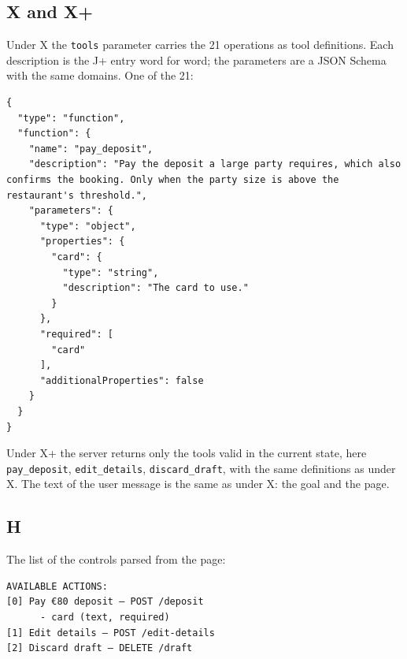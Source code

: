 \subsection{X and X+}\label{app:surfaces:mcp}

Under X the \texttt{tools} parameter carries the 21 operations as tool definitions.
Each description is the J+ entry word for word; the parameters are a JSON Schema with the same domains.
One of the 21:
\begin{Verbatim}
{
  "type": "function",
  "function": {
    "name": "pay_deposit",
    "description": "Pay the deposit a large party requires, which also confirms the booking. Only when the party size is above the restaurant's threshold.",
    "parameters": {
      "type": "object",
      "properties": {
        "card": {
          "type": "string",
          "description": "The card to use."
        }
      },
      "required": [
        "card"
      ],
      "additionalProperties": false
    }
  }
}
\end{Verbatim}
Under X+ the server returns only the tools valid in the current state, here \texttt{pay\_deposit}, \texttt{edit\_details}, \texttt{discard\_draft}, with the same definitions as under X. The text of the user message is the same as under X: the goal and the page.

\subsection{H}\label{app:surfaces:h}

The list of the controls parsed from the page:
\begin{Verbatim}
AVAILABLE ACTIONS:
[0] Pay €80 deposit — POST /deposit
      - card (text, required)
[1] Edit details — POST /edit-details
[2] Discard draft — DELETE /draft
\end{Verbatim}
